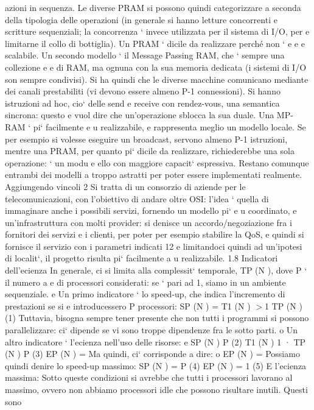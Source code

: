 \documentclass[a4paper,12pt]{article}
\begin{document}
azioni in sequenza. Le diverse PRAM si possono quindi categorizzare a seconda
della tipologia delle operazioni (in generale si hanno letture concorrenti e scritture sequenziali; la concorrenza `
invece utilizzata per il sistema di I/O, per
e
limitarne il collo di bottiglia). Un PRAM ` dicile da realizzare perché non `
e
e
e
scalabile.
Un secondo modello ` il Message Passing RAM, che ` sempre una collezione
e
e
di RAM, ma ognuna con la sua memoria dedicata (i sistemi di I/O son sempre
condivisi). Si ha quindi che le diverse macchine comunicano mediante dei canali
prestabiliti (vi devono essere almeno P-1 connessioni). Si hanno istruzioni ad
hoc, cio` delle send e receive con rendez-vous, una semantica sincrona: questo
e
vuol dire che un'operazione sblocca la sua duale. Una MP-RAM ` pi` facilmente
e u
realizzabile, e rappresenta meglio un modello locale. Se per esempio si volesse
eseguire un broadcast, servono almeno P-1 istruzioni, mentre una PRAM, per
quanto pi` dicile da realizzare, richiederebbe una sola operazione: ` un modu
e
ello con maggiore capacit` espressiva. Restano comunque entrambi dei modelli
a
troppo astratti per poter essere implementati realmente. Aggiungendo vincoli
2 Si tratta di un consorzio di aziende per le telecomunicazioni, con l'obiettivo di andare
oltre OSI: l'idea ` quella di immaginare anche i possibili servizi, fornendo un modello pi`
e
u
coordinato, e un'infrastruttura con molti provider: si denisce un accordo/negoziazione fra i
fornitori dei servizi e i clienti, per poter per esempio stabilire la QoS, e quindi si fornisce il
servizio con i parametri indicati
12
\newpage
e limitandoci quindi ad un'ipotesi di localit`, il progetto risulta pi` facilmente
a
u
realizzabile.
1.8
Indicatori dell'ecienza
In generale, ci si limita alla complessit` temporale, TP (N ), dove P ` il numero
a
e
di processori considerati: se ` pari ad 1, siamo in un ambiente sequenziale.
e
Un primo indicatore ` lo speed-up, che indica l'incremento di prestazioni se si
e
introducessero P processori:
SP (N ) =
T1 (N )
$>$1
TP (N )
(1)
Tuttavia, bisogna sempre tener presente che non tutti i programmi si possono
parallelizzare: ci` dipende se vi sono troppe dipendenze fra le sotto parti.
o
Un altro indicatore ` l'ecienza nell'uso delle risorse:
e
SP (N )
P
(2)
T1 (N ) 1
·
TP (N ) P
(3)
EP (N ) =
Ma quindi, ci` corrisponde a dire:
o
EP (N ) =
Possiamo quindi denire lo speed-up massimo:
SP (N ) = P
(4)
EP (N ) = 1
(5)
E l'ecienza massima:
Sotto queste condizioni si avrebbe che tutti i processori lavorano al massimo,
ovvero non abbiamo processori idle che possono risultare inutili. Questi sono
\end{document}
